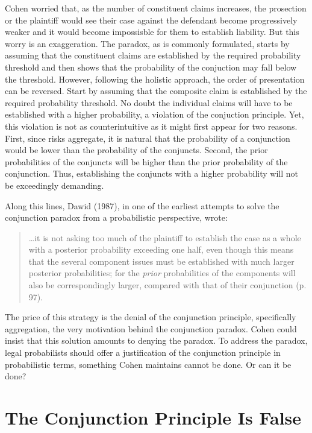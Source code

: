 \documentclass[
  10pt,
  dvipsnames,enabledeprecatedfontcommands]{scrartcl}
\begin{document}
Cohen worried that, as the number of constituent claims increases, the
prosection or the plaintiff would see their case against the defendant
become progressively weaker and it would become impossisble for them to
establish liability. But this worry is an exaggeration. The paradox, as
is commonly formulated, starts by assuming that the constituent claims
are established by the required probability threshold and then shows
that the probability of the conjuction may fall below the threshold.
However, following the holistic approach, the order of presentation can
be reversed. Start by assuming that the composite claim is established
by the required probability threshold. No doubt the individual claims
will have to be established with a higher probability, a violation of
the conjuction principle. Yet, this violation is not as counterintuitive
as it might first appear for two reasons. First, since risks aggregate,
it is natural that the probability of a conjunction would be lower than
the probability of the conjuncts. Second, the prior probabilities of the
conjuncts will be higher than the prior probability of the conjunction.
Thus, establishing the conjuncts with a higher probability will not be
exceedingly demanding.

Along this lines, Dawid (1987), in one of the earliest attempts to solve
the conjunction paradox from a probabilistic perspective, wrote:

\begin{quote}
\dots it is not asking too much of the plaintiff to establish the case as a whole with a posterior probability exceeding one half, even though this means  that the several component issues must be established with much larger posterior probabilities; for the \textit{prior}  probabilities of the components will also be correspondingly larger, compared with that of their conjunction (p. 97).
 \end{quote}

\noindent  The price of this strategy is the denial of the conjunction
principle, specifically aggregation, the very motivation behind the
conjunction paradox. Cohen could insist that this solution amounts to
denying the paradox. To address the paradox, legal probabilists should
offer a justification of the conjunction principle in probabilistic
terms, something Cohen maintains cannot be done. Or can it be done?

\hypertarget{the-conjunction-principle-is-false}{%
\section{The Conjunction Principle Is
False}\label{the-conjunction-principle-is-false}}
\end{document}

